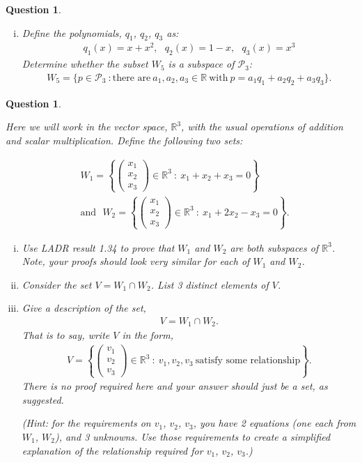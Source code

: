 \documentclass[12pt]{article}
\newtheorem{question}[thm]{Question}
\def\real{{\mathbb R}}
\def\P{\mathcal P}
\newcommand{\ColVecThree}[3]{\begin{pmatrix} #1\\ #2\\ #3\end{pmatrix}}
\newcommand{\intersect}{\cap}
\begin{document}
\begin{question}
\begin{enumerate}[(i)]
		
		\item 
		Define the polynomials, $q_1$, $q_2$, $q_3$ as:
		\begin{align*}
			q_1(x) = x+x^2,\ \ \ q_2(x) = 1-x,\ \ \ q_3(x) = x^3
		\end{align*}
		Determine whether the subset $W_5$  is a subspace of $\P_3$:
		\begin{align*}
			W_5 = 
			\{ p\in\P_3\ : \text{there are}\ a_1,a_2,a_3\in\real\ \text{with}\ p=a_1 q_1 + a_2 q_2 + a_3 q_3 \}.
		\end{align*}
		
	\end{enumerate}
	
	
	
\end{question}


\vspace{.6cm}


\begin{question}\label{que:SubspaceSpecific}
	\normalfont
	
	Here we will work in the vector space, $\real^3$, with the usual operations of addition and scalar multiplication.  Define the following two sets:
	
	\begin{align*}
		&W_1 = \left\{ \ColVecThree{x_1}{x_2}{x_3}\in \real^3\ :\ x_1 + x_2 + x_3 = 0 \right\}\\
		&\text{and}\ \ \ 
		W_2 = \left\{ \ColVecThree{x_1}{x_2}{x_3}\in \real^3\ :\ x_1 + 2x_2 - x_3 = 0 \right\}.
	\end{align*}
	
	\begin{enumerate}[(i)]
		\item Use LADR result 1.34 to prove that $W_1$ and $W_2$ are both subspaces of $\real^3$.  Note, your proofs should look very similar for each of $W_1$ and $W_2$.
		
		\item Consider the set $V=W_1\intersect W_2$.  List 3 distinct elements of $V$.
		
		\item Give a description of the set, 
		\begin{align*}
			V= W_1 \intersect W_2.
		\end{align*}
		That is to say, write $V$ in the form,
		\begin{align*}
			V = \left\{ \ColVecThree{v_1}{v_2}{v_3}\in\real^3\ :\ v_1, v_2, v_3\ \text{satisfy some relationship} \right\}.
		\end{align*}
		There is no proof required here and your answer should just be a set, as suggested.
		
		
		(Hint: for the requirements on $v_1$, $v_2$, $v_3$, you have 2 equations (one each from $W_1$, $W_2$), and 3 unknowns.  Use those requirements to create a simplified explanation of the relationship required for $v_1$, $v_2$, $v_3$.)
		
		
			\end{enumerate}
\end{question}
\end{document}
